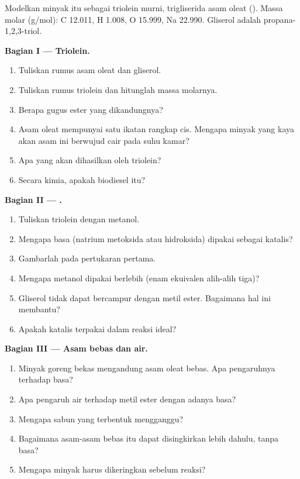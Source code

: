 \begin{problem}
\label{pb:b2:acyl-substitution:1}
Modelkan minyak itu sebagai triolein murni, trigliserida asam oleat
(). Massa molar
(\unit{g/mol}): C 12.011, H 1.008, O 15.999, Na 22.990. Gliserol adalah
propana-1,2,3-triol.

\medskip
\noindent\textbf{Bagian I --- Triolein.}
\begin{enumerate}
  \item Tuliskan rumus asam oleat dan gliserol.
  \item Tuliskan rumus triolein dan hitunglah massa molarnya.
  \item Berapa gugus ester yang dikandungnya?
  \item Asam oleat mempunyai satu ikatan rangkap cis. Mengapa minyak yang
        kaya akan asam ini berwujud cair pada suhu kamar?
  \item Apa yang akan dihasilkan oleh  triolein?
  \item Secara kimia, apakah biodiesel itu?
\end{enumerate}

\medskip
\noindent\textbf{Bagian II --- .}
\begin{enumerate}[resume]
  \item Tuliskan  triolein dengan metanol.
  \item Mengapa basa (natrium metoksida atau hidroksida) dipakai sebagai katalis?
  \item Gambarlah  pada pertukaran pertama.
  \item Mengapa metanol dipakai berlebih (enam ekuivalen alih-alih tiga)?
  \item Gliserol tidak dapat bercampur dengan metil ester. Bagaimana hal ini membantu?
  \item Apakah katalis terpakai dalam reaksi ideal?
\end{enumerate}

\medskip
\noindent\textbf{Bagian III --- Asam bebas dan air.}
\begin{enumerate}[resume]
  \item Minyak goreng bekas mengandung asam oleat bebas. Apa pengaruhnya terhadap basa?
  \item Apa pengaruh air terhadap metil ester dengan adanya basa?
  \item Mengapa sabun yang terbentuk mengganggu?
  \item Bagaimana asam-asam bebas itu dapat disingkirkan lebih dahulu, tanpa basa?
  \item Mengapa minyak harus dikeringkan sebelum reaksi?
\end{enumerate}


\end{problem}
